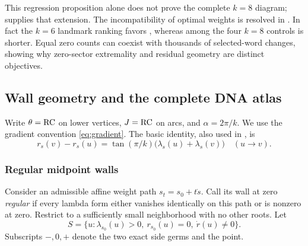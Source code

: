 This regression proposition alone does not prove the complete $k=8$
diagram;  supplies that extension.
The incompatibility of optimal weights is resolved in
.  In fact the $k=6$ landmark ranking favors ,
whereas among the four $k=8$ controls  is shorter.  Equal zero
counts can coexist with thousands of selected-word changes, showing why
zero-sector extremality and residual geometry are distinct objectives.

\subsection{Wall geometry and the complete DNA atlas}
\label{sec:walls-atlas}
Write $\theta=\operatorname{RC}$ on lower vertices, $J=\operatorname{RC}$ on arcs, and
$\alpha=2\pi/k$. We use the gradient convention \eqref{eq:gradient}.
The basic identity, also used in , is
\begin{equation}
 r_s(v)-r_s(u)=\tan(\pi/k)\bigl(\lambda_s(u)+\lambda_s(v)\bigr)
 \quad (u\to v).
 \label{eq:wall-increment}
\end{equation}

\subsubsection{Regular midpoint walls}
Consider an admissible affine weight path $s_t=s_0+t\dot s$. Call its
wall at zero \emph{regular} if every lambda form either vanishes
identically on this path or is nonzero at zero. Restrict to a sufficiently
small neighborhood with no other roots. Let
\[
 S=\{u:\lambda_{s_0}(u)>0,\ r_{s_0}(u)=0,\ \dot r(u)\ne0\}.
\]
Subscripts $-,0,+$ denote the two exact side germs and the point.


